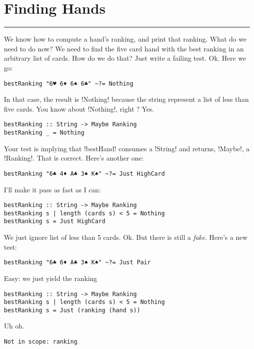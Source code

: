 \newpage
\section{Finding Hands} 
\vspace{10cm}
\hrule

\lhQ We know how to compute a hand's ranking, and print that ranking. What do we need to do now?
\lhA We need to find the five card hand with the best ranking in an arbitrary list of cards.
\lhN How do we do that?
\lhA Just write a failing test.
\lhN Ok. Here we go:
\begin{lstlisting}[frame=single]
bestRanking "6♥ 6♦ 6♠ 6♣" ~?= Nothing
\end{lstlisting}
In that case, the result is \il!Nothing! because the string represent a list of less than five cards. You know about \il!Nothing!, right ?
\lhA \error Yes. 
\begin{lstlisting}[frame=single]
bestRanking :: String -> Maybe Ranking
bestRanking _ = Nothing
\end{lstlisting}
\success Your test is implying that \il!bestHand! consumes a \il!String! and returns, \il!Maybe!, a \il!Ranking!. 
\lhN That is correct. Here's another one:
\begin{lstlisting}[frame=single]
bestRanking "6♣ 4♦ A♣ 3♠ K♠" ~?= Just HighCard
\end{lstlisting}
\lhA \failure I'll make it pass as fast as I can:
\begin{lstlisting}[frame=single]
bestRanking :: String -> Maybe Ranking
bestRanking s | length (cards s) < 5 = Nothing
bestRanking s = Just HighCard
\end{lstlisting}
\success We just ignore list of less than 5 cards.
\lhN Ok. But there is still a \emph{fake}. Here's a new test:
\begin{lstlisting}[frame=single]
bestRanking "6♣ 6♦ A♣ 3♠ K♠" ~?= Just Pair
\end{lstlisting}
\lhA Easy: we just yield the ranking
\begin{lstlisting}[frame=single]
bestRanking :: String -> Maybe Ranking
bestRanking s | length (cards s) < 5 = Nothing
bestRanking s = Just (ranking (hand s))
\end{lstlisting}
\error Uh oh.
\lhN
\begin{small}
\begin{verbatim}
Not in scope: ranking
\end{verbatim}
\end{small}
